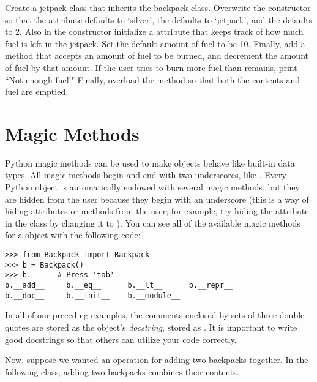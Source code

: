 \begin{problem}

Create a jetpack class that inherits the backpack class.
Overwrite the constructor so that the  attribute defaults to `silver', the  defaults to `jetpack', and the  defaults to 2.
Also in the constructor initialize a  attribute that keeps track of how much fuel is left in the jetpack.
Set the default amount of fuel to be 10.
Finally, add a  method that accepts an amount of fuel to be burned, and decrement the amount of fuel by that amount.
If the user tries to burn more fuel than remains, print ``Not enough fuel!"
Finally, overload the  method so that both the contents and fuel are emptied.
\end{problem}

\section*{Magic Methods}

Python magic methods can be used to make objects behave like built-in data types.
All magic methods begin and end with two underscores, like .
Every Python object is automatically endowed with several magic methods, but they are hidden from the user because they begin with an underscore (this is a way of hiding attributes or methods from the user; for example, try hiding the  attribute in the  class by changing it to ).
You can see all of the available magic methods for a  object with the following code:

\begin{lstlisting}
>>> from Backpack import Backpack
>>> b = Backpack()
>>> b.__	# Press 'tab'
b.__add__     b.__eq__      b.__lt__      b.__repr__    
b.__doc__     b.__init__    b.__module__
\end{lstlisting}

In all of our preceding examples, the comments enclosed by sets of three double quotes are stored as the object's \emph{docstring}, stored as .
It is important to write good docstrings so that others can utilize your code correctly.

Now, suppose we wanted an operation for adding two backpacks together.
In the following class, adding two backpacks combines their contents.


